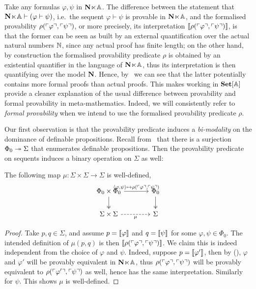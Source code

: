 \begin{remark}\label{rem:provabilityandformalprovability}
  Take any formulas $\varphi,\psi$ in $\mathbf N\hspace{-.4ex}\ltimes\hspace{-.4ex}\mathbb{A}$. The difference between the statement that $\mathbf N\hspace{-.4ex}\ltimes\hspace{-.4ex}\mathbb{A} \vdash (\varphi \vdash \psi)$, i.e.\ the sequent $\varphi \vdash \psi$ is provable in $\mathbf N\hspace{-.4ex}\ltimes\hspace{-.4ex}\mathbb{A}$, and the formalised provability $\rho(\ulcorner \varphi \urcorner,\ulcorner \psi \urcorner)$, or more precisely, its interpretation $\llbracket\rho(\ulcorner \varphi \urcorner,\ulcorner \psi \urcorner)\rrbracket$, is that the former can be seen as built by an external quantification over the actual natural numbers $\mathbb{N}$, since any actual proof has finite length; on the other hand, by construction the formalised provability predicate $\rho$ is obtained by an existential quantifier in the language of $\mathbf N\hspace{-.4ex}\ltimes\hspace{-.4ex}\mathbb{A}$, thus its interpretation is then quantifying over the model $\mathbf N$. Hence, by~ we can see that the latter potentially contains more formal proofs than actual proofs. This makes working in $\mathbf{Set}[\mathbb{A}]$ provide a cleaner explanation of the usual difference between provability and formal provability in meta-mathematics. Indeed, we will consistently refer to \emph{formal provability} when we intend to use the formalised provability predicate $\rho$.
\end{remark}

Our first observation is that the provability predicate induces a \emph{bi-modality} on the dominance of definable propositions. Recall from~ that there is a surjection $\Phi_0 \twoheadrightarrow \Sigma$ that enumerates definable propositions. Then the provability predicate on sequents induces a binary operation on $\Sigma$ as well:

\begin{proposition}\label{prop:sequentderivabilityoperator}
  The following map $\mu \colon \Sigma \times \Sigma \to \Sigma$ is well-defined,
  \[
  \begin{tikzcd}[column sep = large]
    \Phi_0 \times \Phi_0 \ar[d, two heads] \ar[r, "{\pair{\varphi,\psi} \mapsto \rho(\gn{\varphi},\gn{\psi})}"] & \Phi_0 \ar[d, two heads] \\
    \Sigma \times \Sigma \ar[r, dashed, "\mu"'] & \Sigma
  \end{tikzcd}
  \]
\end{proposition}
\begin{proof}
  Take $p,q\in\Sigma$, and assume $p = \llbracket\varphi\rrbracket$ and $q = \llbracket\psi\rrbracket$ for some $\varphi,\psi\in\Phi_0$. The intended definition of $\mu(p,q)$ is then $\llbracket\rho(\ulcorner \varphi \urcorner,\ulcorner \psi \urcorner)\rrbracket$. We claim this is indeed independent from the choice of $\varphi$ and $\psi$. Indeed, suppose $p = \llbracket\varphi'\rrbracket$, then by (\AxiomSQCA), $\varphi$ and $\varphi'$ will be provably equivalent in $\mathbf N\hspace{-.4ex}\ltimes\hspace{-.4ex}\mathbb{A}$, thus $\rho(\ulcorner \varphi \urcorner,\ulcorner \psi \urcorner)$ will be provably equivalent to $\rho(\ulcorner \varphi' \urcorner,\ulcorner \psi \urcorner)$ as well, hence has the same interpretation. Similarly for $\psi$. This shows $\mu$ is well-defined.
\end{proof}

